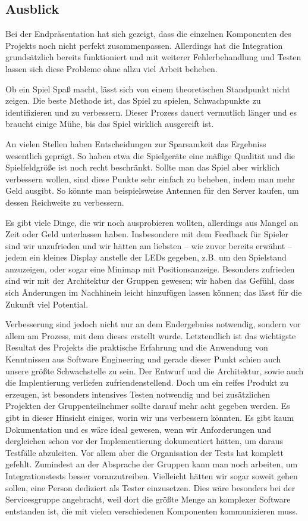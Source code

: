 \subsection{Ausblick}
\label{sec:ausblick}

Bei der Endpräsentation hat sich gezeigt, dass die einzelnen Komponenten des
Projekts noch nicht perfekt zusammenpassen. Allerdings hat die Integration
grundsätzlich bereits funktioniert und mit weiterer Fehlerbehandlung und
Testen lassen sich diese Probleme ohne allzu viel Arbeit beheben.

Ob ein Spiel Spaß macht, lässt sich von einem theoretischen Standpunkt nicht
zeigen. Die beste Methode ist, das Spiel zu spielen, Schwachpunkte zu
identifizieren und zu verbessern. Dieser Prozess dauert vermutlich länger und
es braucht einige Mühe, bis das Spiel wirklich ausgereift ist.

An vielen Stellen haben Entscheidungen zur Sparsamkeit das Ergebniss wesentlich
geprägt. So haben etwa die Spielgeräte eine mäßige Qualität und die
Spielfeldgröße ist noch recht beschränkt. Sollte man das Spiel aber wirklich
verbessern wollen, sind diese Punkte sehr einfach zu beheben, indem man
mehr Geld ausgibt. So könnte man beispielsweise Antennen für den Server kaufen,
um dessen Reichweite zu verbessern.

Es gibt viele Dinge, die wir noch ausprobieren wollten, allerdings aus
Mangel an Zeit oder Geld unterlassen haben. Insbesondere mit dem Feedback für
Spieler sind wir unzufrieden und wir hätten am liebsten – wie zuvor bereits
erwähnt – jedem ein kleines Display anstelle der LEDs gegeben, z.B. um den
Spielstand anzuzeigen, oder sogar eine Minimap mit Positionsanzeige.
Besonders zufrieden sind wir mit der Architektur der Gruppen gewesen; wir haben
das Gefühl, dass sich Änderungen im Nachhinein leicht hinzufügen lassen können;
das lässt für die Zukunft viel Potential.

Verbesserung sind jedoch nicht nur an dem Endergebniss notwendig, sondern vor
allem am Prozess, mit dem dieses erstellt wurde. Letztendlich ist das wichtigste
Resultat des Projekts die praktische Erfahrung und die Anwendung von Kenntnissen
aus Software Engineering und gerade dieser Punkt schien auch unsere größte
Schwachstelle zu sein. Der Entwurf und die Architektur, sowie auch die
Implentierung verliefen zufriendenstellend. Doch um ein reifes Produkt zu
erzeugen, ist besonders intensives Testen notwendig und bei zusätzlichen
Projekten der Gruppenteilnehmer sollte darauf mehr acht gegeben werden. Es gibt
in dieser Hinsicht einiges, worin wir uns verbessern könnten. Es gibt kaum
Dokumentation und es wäre ideal gewesen, wenn wir Anforderungen und dergleichen
schon vor der Implementierung dokumentiert hätten, um daraus Testfälle
abzuleiten. Vor allem aber die Organisation der Tests hat komplett gefehlt.
Zumindest an der Absprache der Gruppen kann man noch arbeiten, um
Integrationstests besser voranzutreiben. Vielleicht hätten wir sogar soweit
gehen sollen, eine Person dediziert als Tester einzusetzen. Dies wäre
besonders bei der Servicesgruppe angebracht, weil dort die größte Menge an
komplexer Software entstanden ist, die mit vielen verschiedenen Komponenten
kommunizieren muss.

